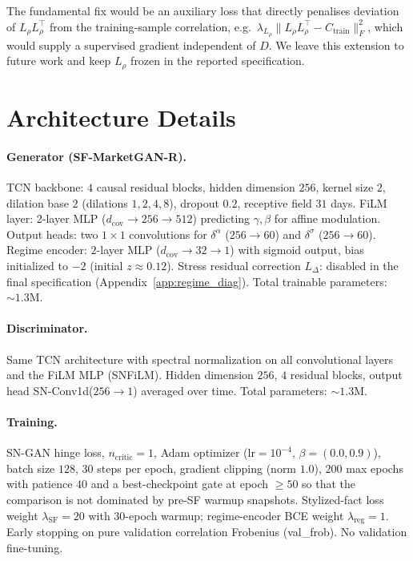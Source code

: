 The fundamental fix would be an auxiliary loss that directly penalises deviation of $L_\rho L_\rho^\top$ from the training-sample correlation, e.g.\ $\lambda_{L_\rho} \|L_\rho L_\rho^\top - C_{\text{train}}\|_F^2$, which would supply a supervised gradient independent of $D$. We leave this extension to future work and keep $L_\rho$ frozen in the reported specification.


\section{Architecture Details}
\label{app:architecture}

\paragraph{Generator (SF-MarketGAN-R).} TCN backbone: $4$ causal residual blocks, hidden dimension $256$, kernel size $2$, dilation base $2$ (dilations $1, 2, 4, 8$), dropout $0.2$, receptive field $31$ days. FiLM layer: 2-layer MLP ($d_\text{cov} \to 256 \to 512$) predicting $\gamma, \beta$ for affine modulation. Output heads: two $1{\times}1$ convolutions for $\delta^\alpha$ ($256 \to 60$) and $\delta^\sigma$ ($256 \to 60$). Regime encoder: $2$-layer MLP ($d_\text{cov} \to 32 \to 1$) with sigmoid output, bias initialized to $-2$ (initial $z \approx 0.12$). Stress residual correction $L_\Delta$: disabled in the final specification (Appendix~\ref{app:regime_diag}). Total trainable parameters: $\sim 1.3$M.

\paragraph{Discriminator.} Same TCN architecture with spectral normalization on all convolutional layers and the FiLM MLP (SNFiLM). Hidden dimension $256$, $4$ residual blocks, output head SN-Conv1d($256 \to 1$) averaged over time. Total parameters: $\sim 1.3$M.

\paragraph{Training.} SN-GAN hinge loss, $n_{\text{critic}} = 1$, Adam optimizer ($\text{lr} = 10^{-4}$, $\beta = (0.0, 0.9)$), batch size $128$, $30$ steps per epoch, gradient clipping (norm $1.0$), $200$ max epochs with patience $40$ and a best-checkpoint gate at epoch $\ge 50$ so that the comparison is not dominated by pre-SF warmup snapshots. Stylized-fact loss weight $\lambda_\text{SF} = 20$ with $30$-epoch warmup; regime-encoder BCE weight $\lambda_\text{reg} = 1$. Early stopping on pure validation correlation Frobenius (val\_frob). No validation fine-tuning.


